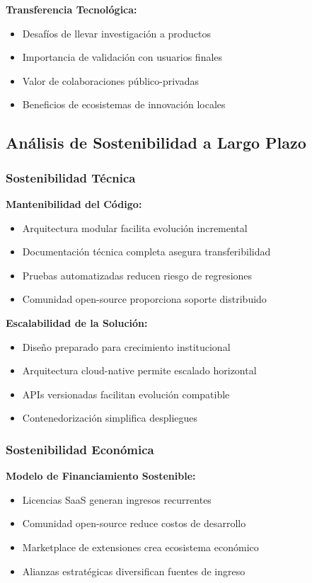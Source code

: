 \textbf{Transferencia Tecnológica:}
\begin{itemize}
\item Desafíos de llevar investigación a productos
\item Importancia de validación con usuarios finales
\item Valor de colaboraciones público-privadas
\item Beneficios de ecosistemas de innovación locales
\end{itemize}

\subsection{Análisis de Sostenibilidad a Largo Plazo}

\subsubsection{Sostenibilidad Técnica}

\textbf{Mantenibilidad del Código:}
\begin{itemize}
\item Arquitectura modular facilita evolución incremental
\item Documentación técnica completa asegura transferibilidad
\item Pruebas automatizadas reducen riesgo de regresiones
\item Comunidad open-source proporciona soporte distribuido
\end{itemize}

\textbf{Escalabilidad de la Solución:}
\begin{itemize}
\item Diseño preparado para crecimiento institucional
\item Arquitectura cloud-native permite escalado horizontal
\item APIs versionadas facilitan evolución compatible
\item Contenedorización simplifica despliegues
\end{itemize}

\subsubsection{Sostenibilidad Económica}

\textbf{Modelo de Financiamiento Sostenible:}
\begin{itemize}
\item Licencias SaaS generan ingresos recurrentes
\item Comunidad open-source reduce costos de desarrollo
\item Marketplace de extensiones crea ecosistema económico
\item Alianzas estratégicas diversifican fuentes de ingreso
\end{itemize}

